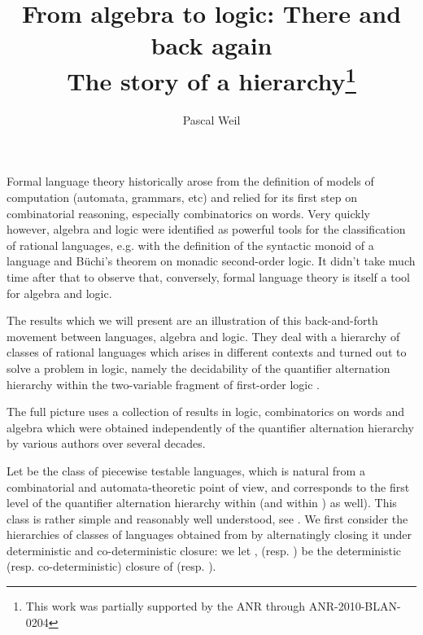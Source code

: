 \documentclass{llncs}
\begin{document}
\title{From algebra to logic: There and back again \\ The story of a hierarchy\thanks{This work was partially supported by the ANR through ANR-2010-BLAN-0204}}

\author{Pascal Weil}







\maketitle


Formal language theory historically arose from the definition of models of computation (automata, grammars, etc) and relied for its first step on combinatorial reasoning, especially combinatorics on words. Very quickly however, algebra and logic were identified as powerful tools for the classification of rational languages, e.g. with the definition of the syntactic monoid of a language and B\"uchi's theorem on monadic second-order logic. It didn't take much time after that to observe that, conversely, formal language theory is itself a tool for algebra and logic.

The results which we will present are an illustration of this back-and-forth movement between languages, algebra and logic. They deal with a hierarchy of classes of rational languages which arises in different contexts and turned out to solve a problem in logic, namely the decidability of the quantifier alternation hierarchy within the two-variable fragment of first-order logic .

The full picture uses a collection of results in logic, combinatorics on words and algebra which were obtained independently of the quantifier alternation hierarchy by various authors over several decades.

Let  be the class of piecewise testable languages, which is natural from a combinatorial and automata-theoretic point of view, and corresponds to the first level of the quantifier alternation hierarchy within  (and within ) as well). This class is rather simple and reasonably well understood, see \cite{1986:Pin,1994:Almeida}. We first consider the hierarchies of classes of languages obtained from  by alternatingly closing it under deterministic and co-deterministic closure:  we let ,  (resp. ) be the deterministic (resp. co-deterministic) closure of  (resp. ).
\end{document}
